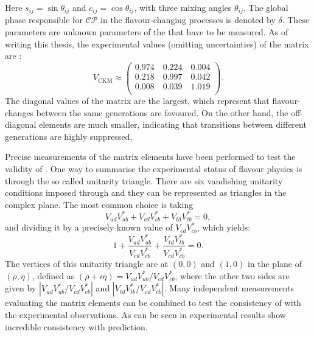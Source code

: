 Here $s_{ij}=\sin\theta_{ij}$ and $c_{ij}=\cos\theta_{ij}$, with three mixing angles $\theta_{ij}$.
The global phase responsible for $\mathcal{CP}$ in the flavour-changing processes is denoted by $\delta$.
These parameters are unknown parameters of the \SM that have to be measured.
As of writing this thesis, the experimental values (omitting uncertainties) of the \CKM matrix are \cite{Workman:2022ynf}:
\begin{equation}
    V_{\mathrm{CKM}} \approx 
    \begin{pmatrix}
        0.974 \quad 0.224 \quad 0.004\\
        0.218 \quad 0.997 \quad 0.042\\
        0.008 \quad 0.039 \quad 1.019\\
    \end{pmatrix}.
\end{equation}
The diagonal values of the \CKM matrix are the largest, which represent that flavour-changes between the same generations are favoured.
On the other hand, the off-diagonal elements are much smaller, indicating that transitions between different generations are highly suppressed,

Precise measurements of the \CKM matrix elements have been performed to test the validity of \SM.
One way to summarise the experimental status of flavour physics is through the so called unitarity triangle.
There are six vandishing unitarity conditions imposed through  and they can be represented as triangles in the complex plane.
The most common choice is taking
\begin{equation}
    V_{ud}V_{ub}^* + V_{cd}V^*_{cb} + V_{td}V_{tb}^* =0,
\end{equation}
and dividing it by a precisely known value of $V_{cd}V^*_{cb}$, which yields:
\begin{equation}
    1+\frac{V^{}_{ud}V_{ub}^*}{V^{}_{cd}V_{cb}^*}+\frac{V^{}_{td}V_{tb}^*}{V^{}_{cd}V_{cb}^*} = 0.
\end{equation}
The vertices of this unitarity triangle are at $(0,0)$ and $(1,0)$ in the plane of $(\bar{\rho},\bar{\eta})$, defined as $(\bar{\rho}+i\bar{\eta})=V^{}_{ud}V_{ub}^*/V^{}_{cd}V_{cb}^*$,
where the other two sides are given by $|V^{}_{ud}V_{ub}^*/V^{}_{cd}V_{cb}^*|$ and $|V^{}_{td}V_{tb}^*/V^{}_{cd}V_{cb}^*|$.
Many independent measurements evaluating the \CKM matrix elements can be combined to test the consistency of \SM with the experimental observations.
As can be seen in  experimental results show incredible consistency with \SM prediction.

